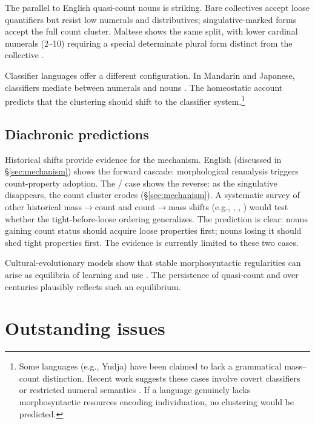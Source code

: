 \documentclass[12pt,a4paper]{article}
\begin{document}
The parallel to English quasi-count nouns is striking. Bare collectives accept loose quantifiers but resist low numerals and distributives; singulative-marked forms accept the full count cluster. Maltese shows the same split, with lower cardinal numerals (2--10) requiring a special determinate plural form distinct from the collective \citep[p.~543]{grimm2018}.

Classifier languages offer a different configuration. In Mandarin and Japanese, classifiers mediate between numerals and nouns \citep{cheng1998,downing1996}. The homeostatic account predicts that the clustering should shift to the classifier system.\footnote{Some languages (e.g., Yudja) have been claimed to lack a grammatical mass--count distinction. Recent work suggests these cases involve covert classifiers or restricted numeral semantics \citep{lima2014}. If a language genuinely lacks morphosyntactic resources encoding individuation, no clustering would be predicted.}

\subsection{Diachronic predictions}

Historical shifts provide evidence for the mechanism. English  (discussed in \S\ref{sec:mechanism}) shows the forward cascade: morphological reanalysis triggers count-property adoption. The / case shows the reverse: as the singulative disappears, the count cluster erodes (\S\ref{sec:mechanism}). A systematic survey of other historical mass$\to$count and count$\to$mass shifts (e.g., , , ) would test whether the tight-before-loose ordering generalizes. The prediction is clear: nouns gaining count status should acquire loose properties first; nouns losing it should shed tight properties first. The evidence is currently limited to these two cases.

Cultural-evolutionary models show that stable morphosyntactic regularities can arise as equilibria of learning and use \citep{kirby2008}. The persistence of quasi-count  and  over centuries plausibly reflects such an equilibrium.

\section{Outstanding issues}\label{sec:outstanding}
\end{document}
